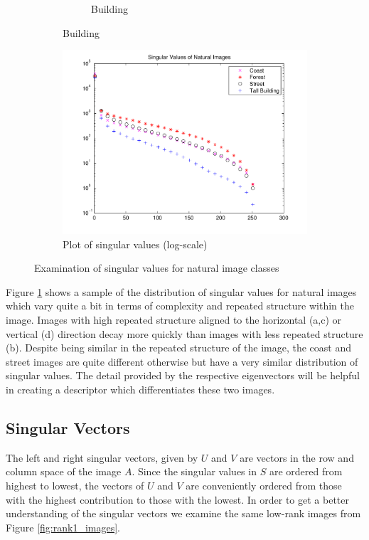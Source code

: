 \documentclass{report}
\begin{document}
\begin{figure}[H]
\begin{subfigure}[b]{0.17\textwidth}
\begin{subfigure}[b]{\textwidth}
        			\caption{Building}
        		\end{subfigure}
        \end{subfigure}
        \begin{subfigure}[b]{0.55\textwidth}
                \includegraphics[width=\textwidth]{graphics/singular_values_natural_images_log.pdf}
                \caption{Plot of singular values (log-scale)}
        \end{subfigure}
        \caption{Examination of singular values for natural image classes}
        \label{fig:singular_values_natural}
\end{figure}

Figure \ref{fig:singular_values_natural} shows a sample of the distribution of singular values for natural images which vary quite a bit in terms of complexity and repeated structure within the image. Images with high repeated structure aligned to the horizontal (a,c) or vertical (d) direction decay more quickly than images with less repeated structure (b). Despite being similar in the repeated structure of the image, the coast and street images are quite different otherwise but have a very similar distribution of singular values. The detail provided by the respective eigenvectors will be helpful in creating a descriptor which differentiates these two images.

\subsection{Singular Vectors}

The left and right singular vectors, given by $U$ and $V$ are vectors in the row and column space of the image $A$. Since the singular values in $S$ are ordered from highest to lowest, the vectors of $U$ and $V$ are conveniently ordered from those with the highest contribution to those with the lowest. In order to get a better understanding of the singular vectors we examine the same low-rank images from Figure \ref{fig:rank1_images}. 
\end{document}

